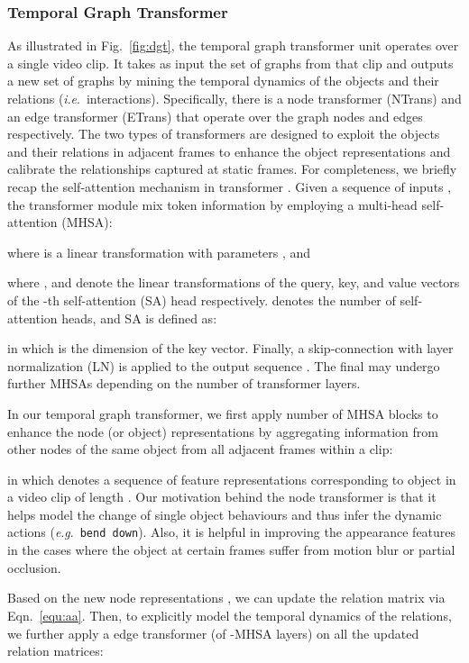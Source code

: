 \documentclass[10pt,journal,compsoc]{IEEEtran}
\newcommand{\ie}{\textit{i}.\textit{e}.}
\newcommand{\eg}{\textit{e}.\textit{g}.}
\begin{document}
\subsubsection{Temporal Graph Transformer}
As illustrated in Fig.~\ref{fig:dgt}, the temporal graph transformer unit operates over a single video clip.  It takes as input the set of graphs  from that clip and outputs a new set of graphs  by mining the temporal dynamics of the objects and their relations (\ie~interactions). Specifically, there is a node transformer (NTrans) and an edge transformer (ETrans) that operate over the graph nodes and edges respectively. The two types of transformers are designed to exploit the objects and their relations in adjacent frames to enhance the object representations and calibrate the relationships captured at static frames.
For completeness, we briefly recap the self-attention mechanism in transformer \cite{vaswani2017attention}. 
Given a sequence of inputs ,
the transformer module mix token information by employing a multi-head self-attention (MHSA):

where  is a linear transformation with parameters , and

where ,  and  denote the linear transformations of the query, key, and value vectors of the -th self-attention (SA) head respectively.  denotes the number of self-attention heads, and SA is defined as:

in which  is the dimension of the key vector. Finally, a skip-connection with layer normalization (LN) is applied to the output sequence . The final  may undergo further MHSAs depending on the number of transformer layers.

In our temporal graph transformer, we first apply  number of MHSA blocks to enhance the node (or object) representations by aggregating information from other nodes of the same object from all  adjacent frames within a clip:

in which  denotes a sequence of feature representations corresponding to object  in a video clip of length . Our motivation behind the node transformer is that it helps model the change of single object behaviours and thus infer the dynamic actions (\eg~\texttt{bend down}). Also, it is helpful in improving the appearance features in the cases where the object at certain frames suffer from motion blur or partial occlusion.

Based on the new node representations , we can update the relation matrix  via Eqn.~\eqref{equ:aa}. Then, to explicitly model the temporal dynamics of the relations, we further apply a edge transformer (of -MHSA layers) on all the updated relation matrices: 
\end{document}
